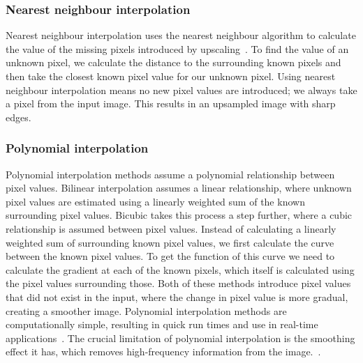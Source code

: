 \subsubsection{Nearest neighbour interpolation}
Nearest neighbour interpolation uses the nearest neighbour algorithm to calculate the value of the missing pixels introduced by upscaling~\cite{nnInterpolation}. To find the value of an unknown pixel, we calculate the distance to the surrounding known pixels and then take the closest known pixel value for our unknown pixel. Using nearest neighbour interpolation means no new pixel values are introduced; we always take a pixel from the input image. This results in an upsampled image with sharp edges.

\subsubsection{Polynomial interpolation}
Polynomial interpolation methods assume a polynomial relationship between pixel values. Bilinear interpolation assumes a linear relationship, where unknown pixel values are estimated using a linearly weighted sum of the known surrounding pixel values. Bicubic takes this process a step further, where a cubic relationship is assumed between pixel values. Instead of calculating a linearly weighted sum of surrounding known pixel values, we first calculate the curve between the known pixel values. To get the function of this curve we need to calculate the gradient at each of the known pixels, which itself is calculated using the pixel values surrounding those. Both of these methods introduce pixel values that did not exist in the input, where the change in pixel value is more gradual, creating a smoother image. Polynomial interpolation methods are computationally simple, resulting in quick run times and use in real-time applications~\cite{interpolation}. The crucial limitation of polynomial interpolation is the smoothing effect it has, which removes high-frequency information from the image.~\cite{interpolation}.

